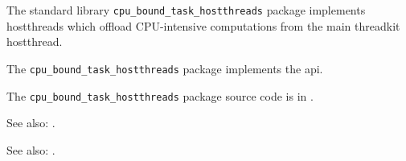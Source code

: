 
The standard library {\tt cpu\_bound\_task\_hostthreads} package implements hostthreads which offload 
CPU-intensive computations from the main threadkit hostthread.

The {\tt cpu\_bound\_task\_hostthreads} package implements the  api.

The {\tt cpu\_bound\_task\_hostthreads} package source code is in .

See also:   .

See also:   .
